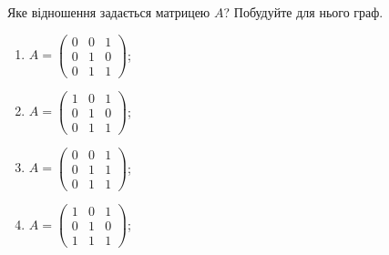 \begin{problem}
	Яке відношення задається матрицею $A$? Побудуйте для нього граф.
	\begin{multicols}{2}
		\begin{enumerate}
			\item $A = \begin{pmatrix} 0 & 0 & 1 \\ 0 & 1 & 0 \\ 0 & 1 & 1 \end{pmatrix}$;
			\item $A = \begin{pmatrix} 1 & 0 & 1 \\ 0 & 1 & 0 \\ 0 & 1 & 1 \end{pmatrix}$;
			\item $A = \begin{pmatrix} 0 & 0 & 1 \\ 0 & 1 & 1 \\ 0 & 1 & 1 \end{pmatrix}$;
			\item $A = \begin{pmatrix} 1 & 0 & 1 \\ 0 & 1 & 0 \\ 1 & 1 & 1 \end{pmatrix}$;
		\end{enumerate}
	\end{multicols}
\end{problem}

